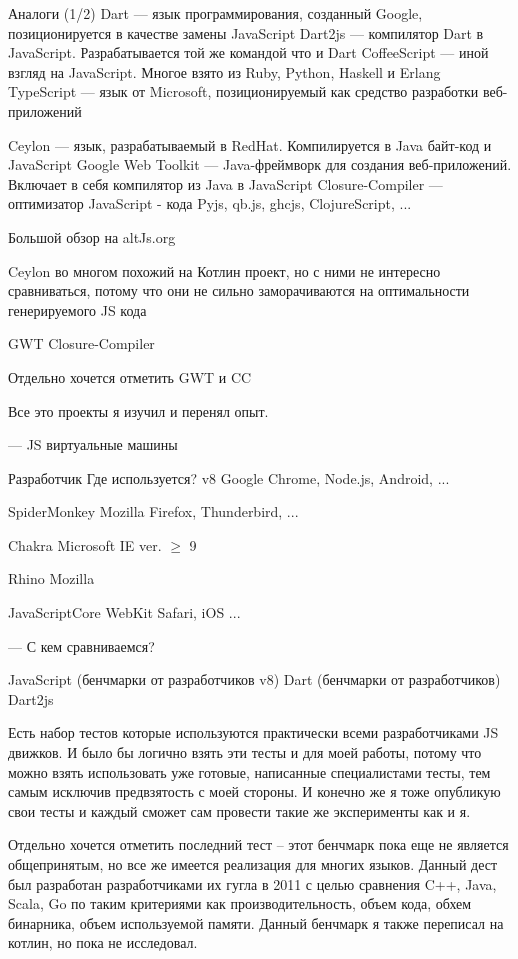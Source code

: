 Аналоги (1/2)
Dart — язык программирования, созданный Google, позиционируется в качестве замены JavaScript
Dart2js — компилятор Dart в JavaScript. Разрабатывается той же командой что и Dart
CoffeeScript — иной взгляд на JavaScript. Многое взято из Ruby, Python, Haskell и Erlang
TypeScript — язык от Microsoft, позиционируемый как средство разработки веб-приложений

Ceylon — язык, разрабатываемый в RedHat. Компилируется в Java байт-код и JavaScript
Google Web Toolkit — Java-фреймворк для создания веб-приложений. Включает в себя компилятор из Java в JavaScript
Closure-Compiler — оптимизатор JavaScript - кода
Pyjs, qb.js, ghcjs, ClojureScript, ...


Большой обзор на altJs.org

Ceylon во многом похожий на Котлин проект, но с ними не интересно сравниваться, потому что они не сильно заморачиваются на оптимальности генерируемого JS кода

GWT
Closure-Compiler

Отдельно хочется отметить GWT и CC 

Все это проекты я изучил и перенял опыт.

---
JS виртуальные машины

 
Разработчик
Где используется?
v8
Google
Chrome, Node.js,
Android, ...

SpiderMonkey
Mozilla 
Firefox,
Thunderbird, ...

Chakra
Microsoft
IE ver. $\geq$ 9

Rhino
Mozilla
 
JavaScriptCore
WebKit
Safari, iOS ...

---
С кем сравниваемся?

JavaScript (бенчмарки от разработчиков v8)
Dart (бенчмарки от разработчиков)
Dart2js


Есть набор тестов которые используются практически всеми разработчиками JS движков. И было бы логично взять эти тесты и для моей работы, потому что можно взять использовать уже готовые, написанные специалистами тесты, тем самым исключив предвзятость с моей стороны. И конечно же я тоже опубликую свои тесты и каждый сможет сам провести такие же эксперименты как и я.

Отдельно хочется отметить последний тест -- этот бенчмарк пока еще не является общепринятым, но все же имеется реализация для многих языков. Данный дест был разработан разработчиками их гугла в 2011 с целью сравнения C++, Java, Scala, Go по таким критериями как производительность, объем кода, обхем бинарника, объем используемой памяти. 
Данный бенчмарк я также переписал на котлин, но пока не исследовал.

